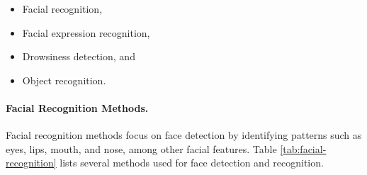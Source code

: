                 \begin{itemize}
                    \item Facial recognition,
                    
                    \item Facial expression recognition,
                    
                    \item Drowsiness detection, and
                    
                    \item Object recognition.
                \end{itemize}
                
                \paragraph{Facial Recognition Methods.}
                Facial recognition methods focus on face detection by identifying patterns such as eyes, lips, mouth, and nose, among other facial features. Table \ref{tab:facial-recognition} lists several methods used for face detection and recognition.
                
